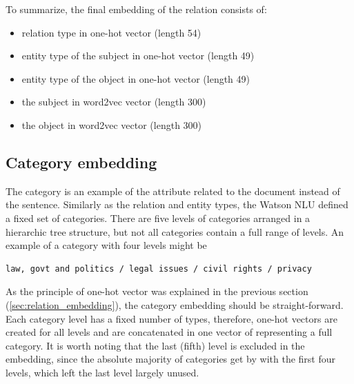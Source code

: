 \documentclass[
  digital, %
  table,   %
  lof,     %
  lot,     %
]{fithesis3}
\begin{document}
To summarize, the final embedding of the relation consists of:
\begin{itemize}
\item relation type in one-hot vector (length 54)
\item entity type of the subject in one-hot vector (length 49)
\item entity type of the object in one-hot vector (length 49)
\item the subject in word2vec vector (length 300)
\item the object in word2vec vector (length 300)
\end{itemize}


\subsection{Category embedding}
The category is an example of the attribute related to the document instead of the sentence.
Similarly as the relation and entity types, the Watson NLU defined a fixed set of categories.
There are five levels of categories arranged in a hierarchic tree structure, but not all categories contain a full range of levels.
An example of a category with four levels might be
\begin{verbatim}
law, govt and politics / legal issues / civil rights / privacy
\end{verbatim}

As the principle of one-hot vector was explained in the previous section (\ref{sec:relation_embedding}), the category embedding should be straight-forward.
Each category level has a fixed number of types, therefore, one-hot vectors are created for all levels and are concatenated in one vector of representing a full category.
It is worth noting that the last (fifth) level is excluded in the embedding, since the absolute majority of categories get by with the first four levels, which left the last level largely unused.

\end{document}
